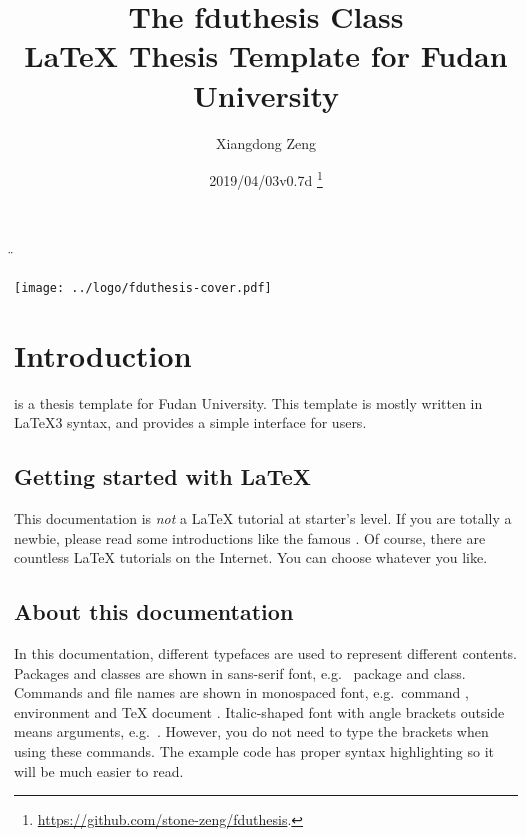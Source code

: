 \documentclass{fdudoc}
\title{\textcolor{MaterialIndigo800}{%
  \textbf{The \textsf{fduthesis} Class \\
    \LaTeX{} Thesis Template for Fudan University}}}
\author{Xiangdong Zeng}
\date{2019/04/03\quad v0.7d%
  \thanks{\url{https://github.com/stone-zeng/fduthesis}.}}
\begin{document}
\DeleteShortVerb\"


\maketitle
\vfill
\begin{center}
  \texttt{[image: ../logo/fduthesis-cover.pdf]}
\end{center}
\vfill
\thispagestyle{plain}
\clearpage

\tableofcontents


\section{Introduction}

 is a thesis template for Fudan University.
This template is mostly written in \LaTeX3 syntax, and
provides a simple interface for users.

\subsection*{Getting started with \LaTeX{}}

This documentation is \emph{not} a \LaTeX{} tutorial at
starter's level. If you are totally a newbie, please read some
introductions like the famous . Of course, there
are countless \LaTeX{} tutorials on the Internet. You can
choose whatever you like.

\subsection*{About this documentation}

In this documentation, different typefaces are used to
represent different contents. Packages and classes are shown
in sans-serif font, e.g.\  package and
 class. Commands and file names are shown in
monospaced font, e.g.\ command , environment
 and \TeX{} document .
Italic-shaped font with angle brackets outside means arguments,
e.g.\ . However, you do not need to type
the brackets when using these commands. The example code has
proper syntax highlighting so it will be much easier to read.
\end{document}

